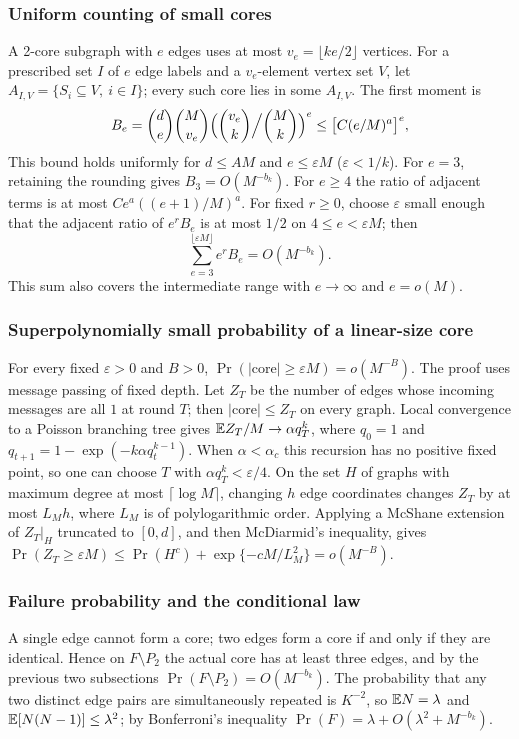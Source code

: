 \subsubsection{Uniform counting of small cores}
A 2-core subgraph with $e$ edges uses at most $v_e=\lfloor ke/2\rfloor$ vertices. For a prescribed
set $I$ of $e$ edge labels and a $v_e$-element vertex set $V$, let
$A_{I,V}=\{S_i\subseteq V,\ i\in I\}$; every such core lies in some $A_{I,V}$. The first moment
is
\begin{equation*}
B_e=\binom de\binom M{v_e}\Bigl(\binom{v_e}k\Big/\binom Mk\Bigr)^e\le\bigl[C(e/M)^a\bigr]^e,
\end{equation*}
This bound holds uniformly for $d\le AM$ and $e\le\varepsilon M$ ($\varepsilon<1/k$). For $e=3$,
retaining the rounding gives $B_3=O(M^{-b_k})$. For $e\ge4$ the ratio of adjacent terms is at
most $Ce^a((e+1)/M)^a$. For fixed $r\ge0$, choose $\varepsilon$ small enough that the adjacent
ratio of $e^rB_e$ is at most $1/2$ on $4\le e<\varepsilon M$; then
\begin{equation}
\sum_{e=3}^{\lfloor\varepsilon M\rfloor}e^rB_e=O(M^{-b_k}).\label{eq:smallcore}
\end{equation}
This sum also covers the intermediate range with $e\to\infty$ and $e=o(M)$.

\subsubsection{Superpolynomially small probability of a linear-size core}
For every fixed $\varepsilon>0$ and $B>0$, $\Pr(|\mathrm{core}|\ge\varepsilon M)=o(M^{-B})$. The
proof uses message passing of fixed depth. Let $Z_T$ be the number of edges whose incoming
messages are all $1$ at round $T$; then $|\mathrm{core}|\le Z_T$ on every graph. Local convergence
to a Poisson branching tree gives $\mathbb E Z_T/M\to\alpha q_T^k$, where $q_0=1$ and
$q_{t+1}=1-\exp(-k\alpha q_t^{k-1})$. When $\alpha<\alpha_c$ this recursion has no positive fixed
point, so one can choose $T$ with $\alpha q_T^k<\varepsilon/4$. On the set $H$ of graphs with
maximum degree at most $\lceil\log M\rceil$, changing $h$ edge coordinates changes $Z_T$ by at
most $L_Mh$, where $L_M$ is of polylogarithmic order. Applying a McShane extension of $Z_T|_H$
truncated to $[0,d]$, and then McDiarmid's inequality, gives
$\Pr(Z_T\ge\varepsilon M)\le\Pr(H^c)+\exp\{-cM/L_M^2\}=o(M^{-B})$.

\subsubsection{Failure probability and the conditional law}
A single edge cannot form a core; two edges form a core if and only if they are identical. Hence
on $F\setminus P_2$ the actual core has at least three edges, and by the previous two subsections
$\Pr(F\setminus P_2)=O(M^{-b_k})$. The probability that any two distinct edge pairs are
simultaneously repeated is $K^{-2}$, so $\mathbb E N=\lambda$ and $\mathbb E[N(N-1)]\le\lambda^2$; by
Bonferroni's inequality $\Pr(F)=\lambda+O(\lambda^2+M^{-b_k})$.

